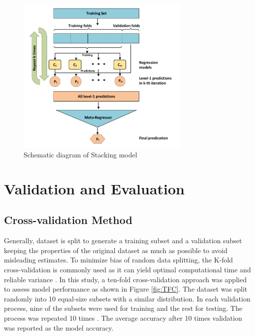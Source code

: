\documentclass[11pt]{article}
\begin{document}
	\begin{figure}[!h]	
		\begin{center}
			\includegraphics[width=0.75\textwidth]{SP}
		\end{center}
		\caption{Schematic diagram of Stacking model \cite{sill2009feature}}
		\label{fig:Stack}
	\end{figure}
	
	
	
	
	
	\section{Validation and Evaluation}
	\label{4}
	
	
	
	\subsection{Cross-validation Method}
	\label{cross}
	Generally, dataset is split to generate a training subset and a validation subset keeping the properties of the original dataset as much as possible to avoid misleading estimates. To minimize bias of random data splitting, the K-fold cross-validation is commonly used as it can yield optimal computational time and reliable variance \cite{chou2014machine,kohavi1995study}. In this study, a ten-fold cross-validation approach was applied to assess model performance as shown in Figure \ref{fig:TFC}. The dataset was split randomly into 10 equal-size subsets with a similar distribution. In each validation process, nine of the subsets were used for training and the rest for testing. The process was repeated 10 times \cite{dor2007achieving}. The average accuracy after 10 times validation was reported as the model accuracy.
	
\end{document}
